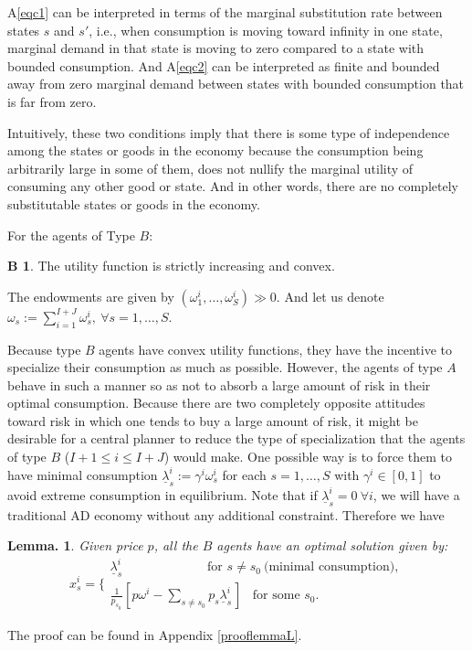 \documentclass[pdftex]{article}
\numberwithin{equation}{section}
\theoremstyle{th}
\newtheorem{lemma}{{Lemma}.}%
\newtheorem{proof lemma}{{Proof Lemma}.}
\theoremstyle{definition}
\newtheorem{B}{B\hspace{-0.15cm}}
\newtheorem*{risk lovers}{Risk lovers}
\newtheorem*{risk averse}{Risk averse}
\begin{document}
A\ref{eqc1} can be interpreted in terms of the marginal substitution rate between states $s$ and $s'$, i.e., when consumption is moving toward infinity in one state, marginal demand in that state is moving to zero compared to a state with bounded consumption. And A\ref{eqc2} can be interpreted as finite and bounded away from zero marginal demand between states with bounded consumption that is far from zero.


{Intuitively, these two conditions imply that there is some type of independence among the states or goods in the economy because the consumption being arbitrarily large in some of them, does not nullify the marginal utility of consuming any other good or state. And in other words, there are no completely substitutable states or goods in the economy.}

For the agents of Type $B$:
\begin{B} The utility function is strictly increasing and convex.\end{B}


The endowments are given by $\left(\omega_1^i,\dots,\omega_S^i\right)\gg0$. And let us denote $\omega_s:=\sum_{i=1}^{I+J}\omega_s^i,\ \forall{s=1,\dots,S}$.

Because type $B$ agents have convex utility functions, they have the incentive to specialize their consumption as much as possible. However, the agents of type $A$ behave in such a manner so as not to absorb a large amount of risk in their optimal consumption. Because there are two completely opposite attitudes toward risk in which one tends to buy a large amount of risk, it might be desirable for a central planner to reduce the type of specialization that the agents of type $B$ ($I+1\leq{i}\leq{I}+J$) would make. One possible way is to force them to have minimal consumption $\underline{\lambda}_s^i:=\gamma^i\omega^i_s$ for each $s=1,\dots,S$ with $\gamma^i\in\left[0,1\right]$ to avoid extreme consumption in equilibrium. Note that if $\underline{\lambda}^i_s=0\ \forall{i}$, we will have a traditional AD economy without any additional constraint. Therefore we have

\begin{lemma}
Given price $p$, all the $B$ agents have an optimal solution given by:\[x^i_s=\Bigg\{\begin{array}{l} \underline{\lambda}^i_s\ \ \ \ \ \ \ \ \ \ \ \ \ \ \ \ \ \ \ \ \ \ \ \ \ \ \ \ \ \ \textrm{for }{s}\neq s_0\ \textrm{(minimal consumption)}, \\ \frac{1}{p_{s^{\,}_{0_{\,}}}}\left[p\omega^i-\sum_{s\neq{s}_0}p_s\underline{\lambda}^{i^{\,^{\,}}}_s\right]\ \ \ \,\textrm{for some }s_0.\end{array}\]\label{lemmaL}
\end{lemma}
The proof can be found in Appendix \ref{prooflemmaL}.
\end{document}
